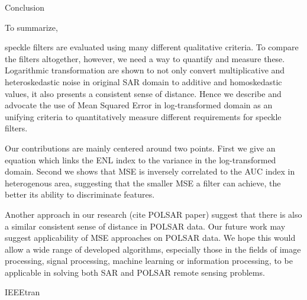 Conclusion

To summarize, 
	
	speckle filters are evaluated using many different qualitative criteria.
To compare the filters altogether, however, we need a way to quantify and measure these.
Logarithmic transformation are shown to not only convert multiplicative and heteroskedastic noise in original SAR domain to additive and homoskedastic values, it also presents a consistent sense of distance.
Hence we describe and advocate the use of Mean Squared Error in log-transformed domain as an unifying criteria to quantitatively measure different requirements for speckle filters.

Our contributions are mainly centered around two points.
First we give an equation which links the ENL index to the variance in the log-transformed domain.
Second we shows that MSE is inversely correlated to the AUC index in heterogenous area, suggesting that the smaller MSE a filter can achieve, the better its ability to discriminate features.



Another approach in our research (cite POLSAR paper) suggest that there is also a similar consistent sense of distance in POLSAR data.
Our future work may suggest applicability of MSE approaches on POLSAR data.
We hope this would allow a wide range of developed algorithms, especially those in the fields of image processing, signal processing, machine learning or information processing, to be applicable in solving both SAR and POLSAR remote sensing problems.














IEEEtran



